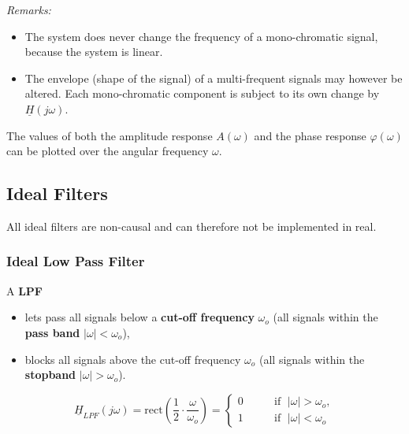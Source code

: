 \begin{refsection}
\textit{Remarks:}
\begin{itemize}
	\item The system does never change the frequency of a mono-chromatic signal, because the system is linear.
	\item The envelope (shape of the signal) of a multi-frequent signals may however be altered. Each mono-chromatic component is subject to its own change by $\underline{H}\left(j \omega\right)$.
\end{itemize}

The values of both the amplitude response $A(\omega)$ and the phase response $\varphi(\omega)$ can be plotted over the angular frequency $\omega$.


\subsection{Ideal Filters}

All ideal filters are non-causal and can therefore not be implemented in real.

\subsubsection{Ideal Low Pass Filter}

A  \textbf{\acf{LPF}}
\begin{itemize}
	\item lets pass all signals below a  \textbf{cut-off frequency} $\omega_o$ (all signals within the  \textbf{pass band} $|\omega| < \omega_o$),
	\item blocks all signals above the cut-off frequency $\omega_o$ (all signals within the  \textbf{stopband} $|\omega| > \omega_o$).
\end{itemize}

\begin{equation}
	\underline{H}_{LPF}\left(j \omega\right) = \mathrm{rect}\left(\frac{1}{2} \cdot \frac{\omega}{\omega_o}\right) = \begin{cases}
		0 & \qquad \text{if } \; |\omega| > \omega_o, \\
		1 & \qquad \text{if } \; |\omega| < \omega_o
	\end{cases}
\end{equation}


\end{refsection}
